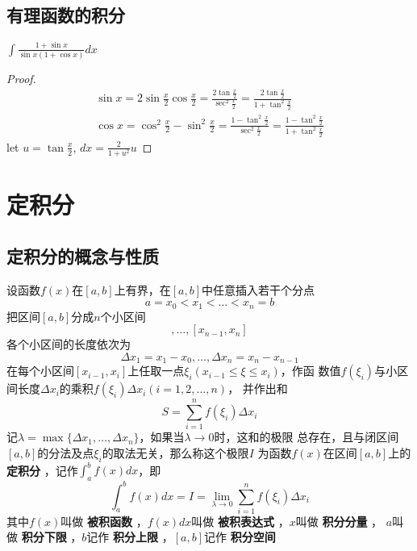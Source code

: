 \documentclass[11pt]{article}
\begin{document}
\subsection{有理函数的积分}
\label{sec:orgf97abaf}
\begin{proposition}[]
\(\int\frac{1+\sin x}{\sin x(1+\cos x)}dx\)
\end{proposition}

\begin{proof}
\begin{gather*}
\sin x=2\sin \frac{x}{2}\cos\frac{x}{2}=\frac{2\tan\frac{x}{2}}{\sec^2\frac{x}{2}}=
\frac{2\tan\frac{x}{2}}{1+\tan^2\frac{x}{2}}\\
\cos x=\cos^2\frac{x}{2}-\sin^2\frac{x}{2}=\frac{1-\tan^2\frac{x}{2}}{\sec^2\frac{x}{2}}=
\frac{1-\tan^2\frac{x}{2}}{1+\tan^2\frac{x}{2}}
\end{gather*}
let \(u=\tan\frac{x}{2}\), \(dx=\frac{2}{1+u^2}u\)
\end{proof}
\section{定积分}
\label{sec:org3fa34f0}
\subsection{定积分的概念与性质}
\label{sec:org2ee0123}
\begin{definition}[]
设函数\(f(x)\)在\([a,b]\)上有界，在\([a,b]\)中任意插入若干个分点
\begin{equation*}
a=x_0<x_1<\dots<x_n=b
\end{equation*}
把区间\([a,b]\)分成\(n\)个小区间
\begin{equation*}
[x_0,x_1],\dots,[x_{n-1},x_n]
\end{equation*}
各个小区间的长度依次为
\begin{equation*}
\Delta x_1=x_1-x_0,\dots,\Delta x_n=x_n-x_{n-1}
\end{equation*}
在每个小区间\([x_{i-1},x_i]\)上任取一点\(\xi_i(x_{i-1}\le\xi\le x_i)\)，作函
数值\(f(\xi_i)\)与小区间长度\(\Delta x_i\)的乘积\(f(\xi_i)\Delta x_i(i=1,2,\dots,n)\)，
并作出和
\begin{equation*}
S=\sum_{i=1}^nf(\xi_i)\Delta x_i
\end{equation*}
记\(\lambda=\max\{\Delta x_1,\dots,\Delta x_n\}\)，如果当\(\lambda\to0\)时，这和的极限
总存在，且与闭区间\([a,b]\)的分法及点\(\xi_i\)的取法无关，那么称这个极限\(I\)
为函数\(f(x)\)在区间\([a,b]\)上的 \textbf{定积分} ，记作\(\int_a^bf(x)dx\)，即
\begin{equation*}
\int_a^bf(x)dx=I=\lim_{\lambda\to0}\sum_{i=1}^nf(\xi_i)\Delta x_i
\end{equation*}
其中\(f(x)\)叫做 \textbf{被积函数} ，\(f(x)dx\)叫做 \textbf{被积表达式} ，\(x\)叫做 \textbf{积分分量} ，
\(a\)叫做 \textbf{积分下限} ，\(b\)记作 \textbf{积分上限} ，\([a,b]\)记作 \textbf{积分空间}
\end{definition}
\end{document}
